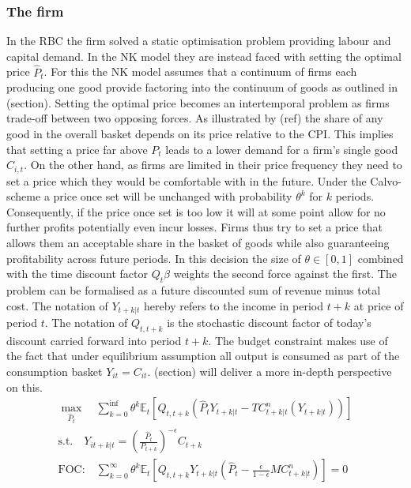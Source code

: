 \documentclass[12pt,a4paper,english]{article} %
\newcommand{\E}{\mathbb{E}} %
\begin{document}
	\subsubsection{The firm}
	In the RBC the firm solved a static optimisation problem providing labour and capital demand. In the NK model they are instead faced with setting the optimal price $\hat{P}_t$. For this the NK model assumes that a continuum of firms each producing one good provide factoring into the continuum of goods as outlined in (section). Setting the optimal price becomes an intertemporal problem as firms trade-off between two opposing forces. 	
	As illustrated by (ref) the share of any good in the overall basket depends on its price relative to the CPI. This implies that setting a price far above $P_t$ leads to a lower demand for a firm's single good $C_{i,t}$. 
	On the other hand, as firms are limited in their price frequency they need to set a price which they would be comfortable with in the future. Under the Calvo-scheme a price once set will be unchanged with probability $\theta^k$ for $k$ periods. Consequently, if the price once set is too low it will at some point allow for no further profits potentially even incur losses. 
	Firms thus try to set a price that allows them an acceptable share in the basket of goods while also guaranteeing profitability across future periods. In this decision the size of $\theta \in [0,1]$ combined with the time discount factor $Q_t \beta$ weights the second force against the first. 
	The problem can be formalised as a future discounted sum of revenue minus total cost. The notation of $Y_{t+k|t}$ hereby refers to the income in period $t+k$ at price of period $t$. The notation of $Q_{t,t+k}$ is the stochastic discount factor of today's discount carried forward into period $t+k$. The budget constraint makes use of the fact that under equilibrium assumption all output is consumed as part of the consumption basket $Y_{it} = C_{it}$. (section) will deliver a more in-depth perspective on this.	
	\begin{equation}
		\begin{aligned}
			\max_{\hat{P}_t}
			\quad
			\sum_{k=0}^{\inf} \theta^k \E_t 
			\left[
			Q_{t, t+k} 
			\left(
			\hat{P}_t Y_{t+k|t} - TC_{t+k|t}^n(Y_{t+k|t})
			\right)
			\right] \\
			\textrm{s.t.}
			\quad
			Y_{it+k|t} = \left(\frac{\hat{P}_t}{P_{t+k}} \right)^{-\epsilon} C_{t+k} \\
			\textrm{FOC:} \quad
			\sum_{k=0}^{\infty} \theta^k \E_t 
			\left[
			Q_{t,t+k} Y_{t+k|t} 
			\left(
			\hat{P}_t - \frac{\epsilon}{1 - \epsilon} MC_{t+k|t}^n
			\right)
			\right]
			= 0
		\end{aligned}
	\end{equation}
	
\end{document}
